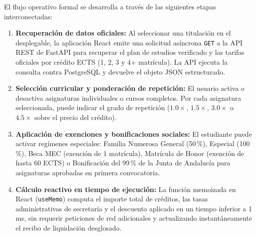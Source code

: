 El flujo operativo formal se desarrolla a través de las siguientes etapas interconectadas:
\begin{enumerate}
    \item \textbf{Recuperación de datos oficiales:} Al seleccionar una titulación en el desplegable, la aplicación React emite una solicitud asíncrona \texttt{GET} a la API REST de FastAPI para recuperar el plan de estudios verificado y las tarifas oficiales por crédito ECTS (1\textordfeminine{}, 2\textordfeminine{}, 3\textordfeminine{} y 4\textordfeminine{}+ matrícula). La API ejecuta la consulta contra PostgreSQL y devuelve el objeto JSON estructurado.
    \item \textbf{Selección curricular y ponderación de repetición:} El usuario activa o desactiva asignaturas individuales o cursos completos. Por cada asignatura seleccionada, puede indicar el grado de repetición (\(1.0\times\), \(1.5\times\), \(3.0\times\) o \(4.5\times\) sobre el precio del crédito).
    \item \textbf{Aplicación de exenciones y bonificaciones sociales:} El estudiante puede activar regímenes especiales: Familia Numerosa General (50\,\%), Especial (100\,\%), Beca MEC (exención de 1\textordfeminine{} matrícula), Matrícula de Honor (exención de hasta 60 ECTS) o Bonificación del 99\,\% de la Junta de Andalucía para asignaturas aprobadas en primera convocatoria.
    \item \textbf{Cálculo reactivo en tiempo de ejecución:} La función memoizada en React (\texttt{useMemo}) computa el importe total de créditos, las tasas administrativas de secretaría y el descuento aplicado en un tiempo inferior a 1 ms, sin requerir peticiones de red adicionales y actualizando instantáneamente el recibo de liquidación desglosado.
\end{enumerate}

